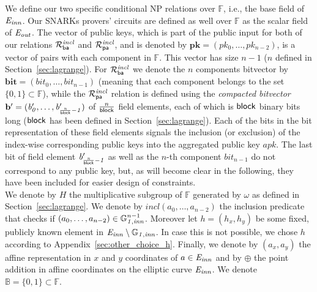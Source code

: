 \noindent We define our two specific conditional NP relations over $\mathbb{F}$, i.e., the base field of $\mathit{E}_{\mathit{inn}}$. 
Our SNARKs provers' circuits are defined as well over $\mathbb{F}$ as the scalar field of $\mathit{E}_{\mathit{out}}$. The vector of public keys, which is part of the public input for both of our 
relations $\mathcal{R}^{\mathit{incl}}_{\mathsf{ba}}$ and $\mathcal{R}^{\mathit{incl}}_{\mathsf{pa}}$, and is denoted by $\mathbf{pk} = (\mathit{pk_0}, \ldots, \mathit{pk_{n-2}})$, is a vector of pairs with each component 
in $\mathbb{F}$. This vector has size $n-1$ ($n$ defined in 
Section~\ref{sec:lagrange}). For $\mathcal{R}^{\mathit{incl}}_{\mathsf{ba}}$ we denote 
the $n$ components bitvector by $\mathbf{bit} = (\mathit{bit_0}, \ldots, \mathit{bit_{n-1}})$ 
(meaning that each component belongs to the set $\{0,1\} \subset \mathbb{F}$), 
while the $\mathcal{R}^{\mathit{incl}}_{\mathsf{pa}}$ relation is defined using the \emph{compacted bitvector} 
$\mathbf{b'} = (\mathit{b'_{0}}, \ldots, \mathit{b'_{\frac{n}{\mathsf{block}}-1}})$ of $\frac{n}{\mathsf{block}}$ field elements, 
each of which is $\mathsf{block}$ binary bits long ($\mathsf{block}$ has been defined in Section~\ref{sec:lagrange}). 
Each of the bits in the bit representation of these field elements signals the 
inclusion (or exclusion) of the index-wise corresponding public keys into the aggregated public key $\mathit{apk}$. The last bit of field element $\mathit{b'_{\frac{n}{\mathsf{block}}-1}}$ as well as the $n$-th component $\mathit{bit_{n-1}}$ do not correspond to any public key, 
but, as will become clear in the following, they have been included for easier design of constraints. \\ 
\vspace{-0.009in}
\noindent We denote by $H$ the multiplicative subgroup of $\mathbb{F}$ generated 
by $\omega$ as defined in Section~\ref{sec:lagrange}. We denote by $\mathit{incl}(a_0, \ldots, a_{n-2})$ the inclusion 
predicate that checks if  $(a_0, \ldots, a_{n-2}) \in \mathbb{G}_{\mathit{1,inn}}^{n-1}$. Moreover let $h = (\mathit{h_x}, \mathit{h_y})$ 
be some fixed, publicly known element in $\mathit{E}_{\mathit{inn}} \setminus \mathbb{G}_{\mathit{1,inn}}$. In case this is not possible, we chose $h$ according to Appendix~\ref{sec:other_choice_h}.  
Finally, we denote by $(a_x, a_y)$ the affine representation in 
$x$ and $y$ coordinates of $a \in \mathit{E}_{\mathit{inn}}$ and by $\oplus$ the point addition in affine coordinates on the elliptic curve $\mathit{E}_{\mathit{inn}}$. 
We denote $\mathbb{B} = \{0,1\} \subset \mathbb{F}$. \\
\vspace{-0.15in}

\vspace{-0.1in}
